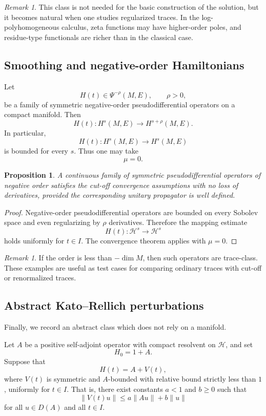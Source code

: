 \documentclass[11pt]{amsart}
\theoremstyle{plain}
\newtheorem{proposition}[theorem]{Proposition}
\theoremstyle{definition}
\theoremstyle{remark}
\newtheorem{remark}[theorem]{Remark}
\newcommand{\Hilb}{\mathcal H}
\begin{document}
\begin{remark}
This class is not needed for the basic construction of the solution,
but it becomes natural when one studies regularized traces.  In the
log-polyhomogeneous calculus, zeta functions may have higher-order
poles, and residue-type functionals are richer than in the classical
case.
\end{remark}

\subsection{Smoothing and negative-order Hamiltonians}

Let
\[
        H(t)\in \Psi^{-\rho}(M,E),
        \qquad \rho>0,
\]
be a family of symmetric negative-order pseudodifferential operators on
a compact manifold.  Then
\[
        H(t):H^s(M,E)\to H^{s+\rho}(M,E).
\]
In particular,
\[
        H(t):H^s(M,E)\to H^s(M,E)
\]
is bounded for every \(s\).  Thus one may take
\[
        \mu=0.
\]

\begin{proposition}
A continuous family of symmetric pseudodifferential operators of
negative order satisfies the cut-off convergence assumptions with no
loss of derivatives, provided the corresponding unitary propagator is
well defined.
\end{proposition}

\begin{proof}
Negative-order pseudodifferential operators are bounded on every
Sobolev space and even regularizing by \(\rho\) derivatives.  Therefore
the mapping estimate
\[
        H(t):\Hilb^s\to\Hilb^s
\]
holds uniformly for \(t\in I\).  The convergence theorem applies with
\(\mu=0\).
\end{proof}

\begin{remark}
If the order is less than \(-\dim M\), then such operators are
trace-class.  These examples are useful as test cases for comparing
ordinary traces with cut-off or renormalized traces.
\end{remark}

\subsection{Abstract Kato--Rellich perturbations}

Finally, we record an abstract class which does not rely on a manifold.

Let \(A\) be a positive self-adjoint operator with compact resolvent on
\(\Hilb\), and set
\[
        H_0=1+A.
\]
Suppose that
\[
        H(t)=A+V(t),
\]
where \(V(t)\) is symmetric and \(A\)-bounded with relative bound
strictly less than \(1\), uniformly for \(t\in I\).  That is, there
exist constants \(a<1\) and \(b\geq0\) such that
\[
        \|V(t)u\|
        \leq
        a\|Au\|+b\|u\|
\]
for all \(u\in D(A)\) and all \(t\in I\).
\end{document}
